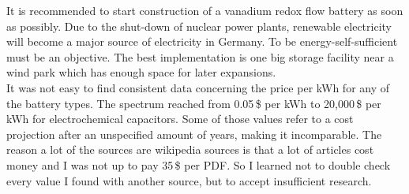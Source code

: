 \documentclass[12pt,a4paper]{article}
\begin{document}
\begin{parcolumns}[colwidths={1=2.5 cm, 2=10 cm, 3=2.5cm}]{3}
{It is recommended to start construction of a vanadium redox flow battery as soon as possibly. Due to the shut-down of nuclear power plants, renewable electricity will become  a major source of electricity in Germany. To be energy-self-sufficient must be an objective. The best implementation is one big storage facility near a wind park which has enough space for later expansions. \\
It was not easy to find consistent data concerning the price per kWh for any of the battery types. The spectrum reached from 0.05\,\$ per kWh to 20,000\,\$ per kWh for electrochemical capacitors. Some of those values refer to a cost projection after an unspecified amount of years, making it incomparable. The reason a lot of the sources are wikipedia sources is that a lot of articles cost money and I was not up to pay 35\,\$ per PDF. So I learned not to double check every value I found with another source, but to accept insufficient research.


}


\end{parcolumns}
\end{document}
